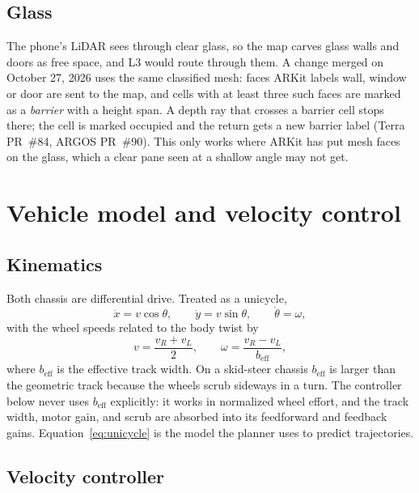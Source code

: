 \subsection{Glass}
\label{sec:auto-glass}

The phone's LiDAR sees through clear glass, so the map carves glass walls and doors as free space, and L3 would route through them.
A change merged on October 27, 2026 uses the same classified mesh: faces ARKit labels wall, window or door are sent to the map, and cells with at least three such faces are marked as a \emph{barrier} with a height span.
A depth ray that crosses a barrier cell stops there; the cell is marked occupied and the return gets a new barrier label (Terra PR~\#84, ARGOS PR~\#90).
This only works where ARKit has put mesh faces on the glass, which a clear pane seen at a shallow angle may not get.

\section{Vehicle model and velocity control}
\label{sec:auto-control}

\subsection{Kinematics}

Both chassis are differential drive.
Treated as a unicycle,
\begin{equation}
  \dot x = v \cos\theta, \qquad \dot y = v \sin\theta, \qquad \dot\theta = \omega,
  \label{eq:unicycle}
\end{equation}
with the wheel speeds related to the body twist by
\begin{equation}
  v = \frac{v_R + v_L}{2}, \qquad \omega = \frac{v_R - v_L}{b_{\text{eff}}},
\end{equation}
where $b_{\text{eff}}$ is the effective track width.
On a skid-steer chassis $b_{\text{eff}}$ is larger than the geometric track because the wheels scrub sideways in a turn.
The controller below never uses $b_{\text{eff}}$ explicitly: it works in normalized wheel effort, and the track width, motor gain, and scrub are absorbed into its feedforward and feedback gains.
Equation~\eqref{eq:unicycle} is the model the planner uses to predict trajectories.

\subsection{Velocity controller}

